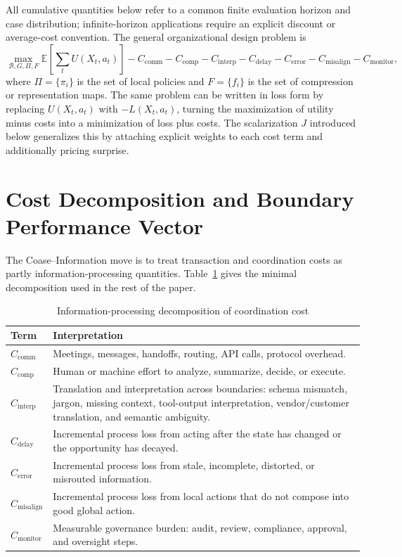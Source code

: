 \documentclass[11pt]{article}
\newcommand{\E}{\mathbb{E}}
\newcommand{\calB}{\mathcal{B}}
\begin{document}
All cumulative quantities below refer to a common finite evaluation
horizon and case distribution; infinite-horizon applications require an
explicit discount or average-cost convention. The general organizational
design problem is
\[
\max_{\calB,G,\Pi,F}
\E\left[\sum_t U(X_t,a_t)\right]
-C_{\mathrm{comm}}
-C_{\mathrm{comp}}
-C_{\mathrm{interp}}
-C_{\mathrm{delay}}
-C_{\mathrm{error}}
-C_{\mathrm{misalign}}
-C_{\mathrm{monitor}},
\]
where \(\Pi=\{\pi_i\}\) is the set of local policies and \(F=\{f_i\}\) is the
set of compression or representation maps.
The same problem can be written in loss form by replacing \(U(X_t,a_t)\)
with \(-L(X_t,a_t)\), turning the maximization of utility minus costs into a
minimization of loss plus costs. The scalarization \(J\) introduced below
generalizes this by attaching explicit weights to each cost term and
additionally pricing surprise.

\section{Cost Decomposition and Boundary Performance Vector}

The Coase--Information move is to treat transaction and coordination costs as
partly information-processing quantities. Table~\ref{tab:costs} gives the
minimal decomposition used in the rest of the paper.

\begin{table}[H]
\centering
\caption{Information-processing decomposition of coordination cost}
\label{tab:costs}
\begin{tabularx}{\textwidth}{@{}l>{\raggedright\arraybackslash}X@{}}
\toprule
Term & Interpretation \\
\midrule
\(C_{\mathrm{comm}}\) & Meetings, messages, handoffs, routing, API calls, protocol overhead. \\
\(C_{\mathrm{comp}}\) & Human or machine effort to analyze, summarize, decide, or execute. \\
\(C_{\mathrm{interp}}\) & Translation and interpretation across boundaries: schema mismatch, jargon, missing context, tool-output interpretation, vendor/customer translation, and semantic ambiguity. \\
\(C_{\mathrm{delay}}\) & Incremental process loss from acting after the state has changed or the opportunity has decayed. \\
\(C_{\mathrm{error}}\) & Incremental process loss from stale, incomplete, distorted, or misrouted information. \\
\(C_{\mathrm{misalign}}\) & Incremental process loss from local actions that do not compose into good global action. \\
\(C_{\mathrm{monitor}}\) & Measurable governance burden: audit, review, compliance, approval, and oversight steps. \\
\bottomrule
\end{tabularx}
\end{table}
\end{document}
